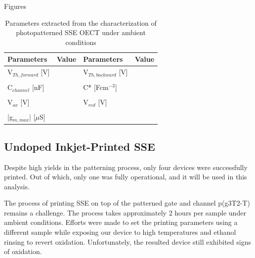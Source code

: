 Figures

\begin{table}[ht]
\centering
\caption{Parameters extracted from the characterization of photopatterned SSE OECT under ambient conditions}
\begin{tabular}{l|c||l|c}
Parameters & Value & Parameters & Value \\\hline \hline
V$_{Th,forward}$ [V] &  & V$_{Th,backward}$ [V] & \\
& & &\\[-1em]
C$_{channel}$ [nF] &  & C* [Fcm$^{-3}$] &  \\
& & &\\[-1em]
V$_{ox}$ [V] &  & V$_{red}$ [V] &  \\
& & &\\[-1em]
|g$_{m,max}$| [$\mu$S] & &  &\\\hline
\end{tabular}
\label{tab:photofom_amb}
\end{table}

\subsection{Undoped Inkjet-Printed SSE}%

Despite high yields in the patterning process, only four devices were successfully printed. Out of which, only one was fully operational, and it will be used in this analysis.

The process of printing SSE on top of the patterned gate and channel p(g3T2-T) remains a challenge. The process takes approximately 2 hours per sample under ambient conditions. Efforts were made to set the printing parameters using a different sample while exposing our device to high temperatures and ethanol rinsing to revert oxidation. Unfortunately, the resulted device still exhibited signs of oxidation.

